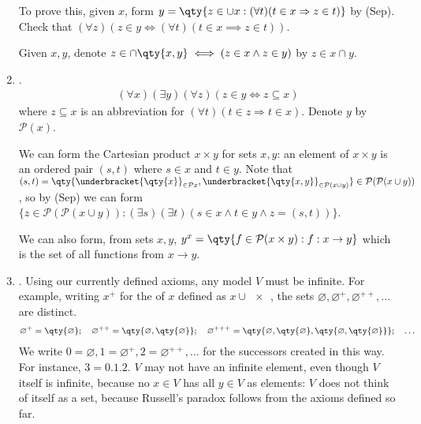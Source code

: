 \begin{enumerate}
\begin{remark}
        To prove this, given $x$, form $y = \qty{z \in \cup x : (\forall t)(t \in x \implies z \in t)}$ by (Sep).
        Check that $(\forall z)(z \in y \iff (\forall t)(t \in x \implies z \in t))$.

        Given $x, y$, denote $z \in \cap \qty{x, y} \iff (z \in x \wedge z \in y)$ by $z \in x \cap y$.
    \end{remark}

    \item {}.
    \begin{align*}
        (\forall x)(\exists y)(\forall z)(z \in y \Leftrightarrow z \subseteq x)
    \end{align*}
    where $z \subseteq x$ is an abbreviation for $(\forall t)(t \in z \Rightarrow t \in x)$.
    Denote $y$ by $\mathcal{P}(x)$.

    We can form the Cartesian product $x \times y$ for sets $x, y$: an element of $x \times y$ is an ordered pair $(s, t)$ where $s \in x$ and $t \in y$.
    Note that $(s, t) = \qty{\underbracket{\qty{x}}_{\in \mathcal{P}x}, \underbracket{\qty{x, y}}_{\in \mathcal{P}(x \cup y)}} \in \mathcal{P}(\mathcal{P}(x \cup y))$, so by (Sep) we can form $\{z \in \mathcal P(\mathcal P(x \cup y)) : (\exists s)(\exists t) (s \in x \wedge t \in y \wedge z = (s, t))\}$.

    We can also form, from sets $x, y$, $y^x = \qty{f \in \mathcal{P}(x \times y) : f : x \to y}$ which is the set of all functions from $x \to y$.

    \item {}.
    Using our currently defined axioms, any model $V$ must be infinite.
    For example, writing $x^+$ for the  of $x$ defined as $x \cup \qty{x}$, the sets $\varnothing, \varnothing^+, \varnothing^{++}, \dots$ are distinct.
    \begin{align*}
        \varnothing^+ = \qty{\varnothing};\quad \varnothing^{++} = \qty{\varnothing, \qty{\varnothing}};\quad \varnothing^{+++} = \qty{\varnothing, \qty{\varnothing}, \qty{\varnothing, \qty{\varnothing}}};\quad \dots
    \end{align*}
    We write $0 = \varnothing, 1 = \varnothing^+, 2 = \varnothing^{++}, \dots$ for the successors created in this way.
    For instance, $3 = \qty{0, 1, 2}$.
    $V$ may not have an infinite element, even though $V$ itself is infinite, because no $x \in V$ has all $y \in V$ as elements: $V$ does not think of itself as a set, because Russell's paradox follows from the axioms defined so far.


\end{enumerate}
